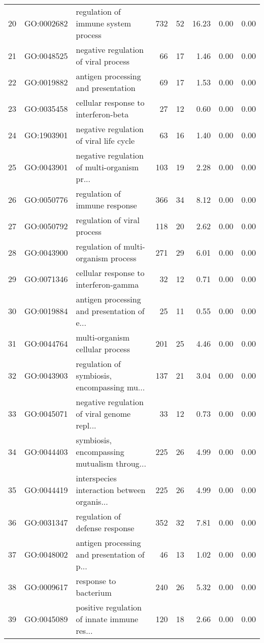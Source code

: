 \begin{table}[ht]
\begin{tabular}{rllrrrrr}
  20 & GO:0002682 & regulation of immune system process & 732 &  52 & 16.23 & 0.00 & 0.00 \\ 
  21 & GO:0048525 & negative regulation of viral process &  66 &  17 & 1.46 & 0.00 & 0.00 \\ 
  22 & GO:0019882 & antigen processing and presentation &  69 &  17 & 1.53 & 0.00 & 0.00 \\ 
  23 & GO:0035458 & cellular response to interferon-beta &  27 &  12 & 0.60 & 0.00 & 0.00 \\ 
  24 & GO:1903901 & negative regulation of viral life cycle &  63 &  16 & 1.40 & 0.00 & 0.00 \\ 
  25 & GO:0043901 & negative regulation of multi-organism pr... & 103 &  19 & 2.28 & 0.00 & 0.00 \\ 
  26 & GO:0050776 & regulation of immune response & 366 &  34 & 8.12 & 0.00 & 0.00 \\ 
  27 & GO:0050792 & regulation of viral process & 118 &  20 & 2.62 & 0.00 & 0.00 \\ 
  28 & GO:0043900 & regulation of multi-organism process & 271 &  29 & 6.01 & 0.00 & 0.00 \\ 
  29 & GO:0071346 & cellular response to interferon-gamma &  32 &  12 & 0.71 & 0.00 & 0.00 \\ 
  30 & GO:0019884 & antigen processing and presentation of e... &  25 &  11 & 0.55 & 0.00 & 0.00 \\ 
  31 & GO:0044764 & multi-organism cellular process & 201 &  25 & 4.46 & 0.00 & 0.00 \\ 
  32 & GO:0043903 & regulation of symbiosis, encompassing mu... & 137 &  21 & 3.04 & 0.00 & 0.00 \\ 
  33 & GO:0045071 & negative regulation of viral genome repl... &  33 &  12 & 0.73 & 0.00 & 0.00 \\ 
  34 & GO:0044403 & symbiosis, encompassing mutualism throug... & 225 &  26 & 4.99 & 0.00 & 0.00 \\ 
  35 & GO:0044419 & interspecies interaction between organis... & 225 &  26 & 4.99 & 0.00 & 0.00 \\ 
  36 & GO:0031347 & regulation of defense response & 352 &  32 & 7.81 & 0.00 & 0.00 \\ 
  37 & GO:0048002 & antigen processing and presentation of p... &  46 &  13 & 1.02 & 0.00 & 0.00 \\ 
  38 & GO:0009617 & response to bacterium & 240 &  26 & 5.32 & 0.00 & 0.00 \\ 
  39 & GO:0045089 & positive regulation of innate immune res... & 120 &  18 & 2.66 & 0.00 & 0.00 \\ 

\end{tabular}
\end{table}
